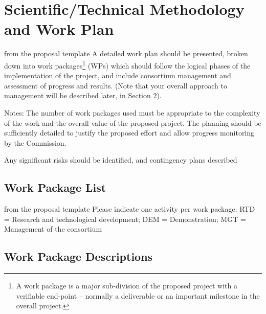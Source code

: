 \section{Scientific/Technical Methodology and Work Plan}\label{sec:methodology}
\begin{todo}{from the proposal template}
  A detailed work plan should be presented, broken down into work packages\footnote{A work
    package is a major sub-division of the proposed project with a verifiable end-point –
    normally a deliverable or an important milestone in the overall project.} (WPs) which
  should follow the logical phases of the implementation of the project, and include
  consortium management and assessment of progress and results. (Note that your overall
  approach to management will be described later, in Section 2).

Notes: The number of work packages used must be appropriate to the complexity of the work
and the overall value of the proposed project. The planning should be sufficiently
detailed to justify the proposed effort and allow progress monitoring by the Commission.

Any significant risks should be identified, and contingency plans described
\end{todo}
\newpage

\newpage
\subsection{Work Package List}\label{sec:wplist}

\begin{todo}{from the proposal template}
Please indicate one activity per work package:
RTD = Research and technological development; DEM = Demonstration; MGT = Management of the consortium
\end{todo}

\wpfigstyle{\footnotesize}

\newpage
\newpage

\subsection{Work Package Descriptions}\label{sec:workpackages}
\begin{workplan}
\newpage
\newpage
\newpage
\newpage
\end{workplan}
\newpage



